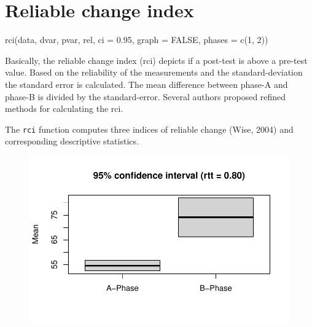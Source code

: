 \documentclass[
  letterpaper,
  DIV=11,
  numbers=noendperiod]{scrreprt}
\newenvironment{Shaded}{\begin{snugshade}}{\end{snugshade}}
\newcommand{\AttributeTok}[1]{\textcolor[rgb]{0.40,0.45,0.13}{#1}}
\newcommand{\ConstantTok}[1]{\textcolor[rgb]{0.56,0.35,0.01}{#1}}
\newcommand{\FloatTok}[1]{\textcolor[rgb]{0.68,0.00,0.00}{#1}}
\newcommand{\FunctionTok}[1]{\textcolor[rgb]{0.28,0.35,0.67}{#1}}
\newcommand{\NormalTok}[1]{\textcolor[rgb]{0.00,0.23,0.31}{#1}}
\newcommand{\SpecialCharTok}[1]{\textcolor[rgb]{0.37,0.37,0.37}{#1}}
\begin{document}
\hypertarget{reliable-change-index}{%
\section{Reliable change index}\label{reliable-change-index}}

\begin{tcolorbox}[enhanced jigsaw, toprule=.15mm, colframe=quarto-callout-tip-color-frame, left=2mm, colback=white, breakable, bottomrule=.15mm, arc=.35mm, rightrule=.15mm, leftrule=.75mm, opacityback=0]
\begin{minipage}[t]{5.5mm}
\textcolor{quarto-callout-tip-color}{\faLightbulb}
\end{minipage}%
\begin{minipage}[t]{\textwidth - 5.5mm}
rci(data, dvar, pvar, rel, ci = 0.95, graph = FALSE, phases = c(1,
2))\end{minipage}%
\end{tcolorbox}

Basically, the reliable change index (rci) depicts if a post-test is
above a pre-test value. Based on the reliability of the measurements and
the standard-deviation the standard error is calculated. The mean
difference between phase-A and phase-B is divided by the standard-error.
Several authors proposed refined methods for calculating the rci.

The \texttt{rci} function computes three indices of reliable change
(Wise, 2004) and corresponding descriptive statistics.

\begin{Shaded}
\end{Shaded}

\begin{figure}[H]

{\centering \includegraphics{./ch_overlapping_indices_files/figure-pdf/unnamed-chunk-28-1.pdf}

}

\end{figure}
\end{document}

